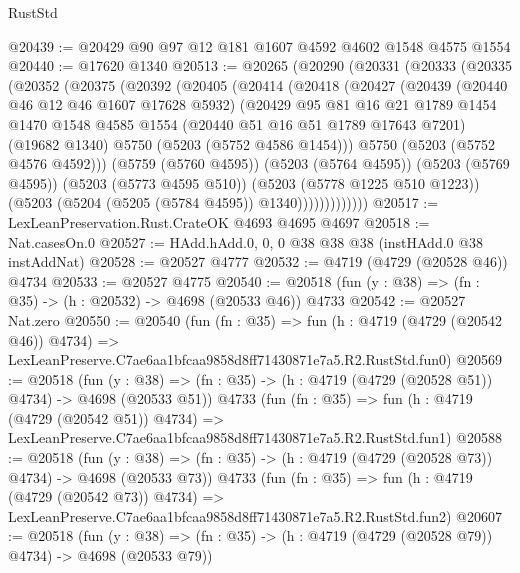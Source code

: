 \begin{lexlean}{RustStd}
\begin{coremodule}
@20439 := @20429 @90 @97 @12 @181 @1607 @4592 @4602 @1548 @4575 @1554
@20440 := @17620 @1340
@20513 := @20265
    (@20290
      (@20331
        (@20333
          (@20335
            (@20352
              (@20375
                (@20392
                  (@20405
                    (@20414
                      (@20418
                        (@20427
                          (@20439
                            (@20440 @46 @12 @46 @1607 @17628 @5932)
                            (@20429
                              @95
                              @81
                              @16
                              @21
                              @1789
                              @1454
                              @1470
                              @1548
                              @4585
                              @1554
                              (@20440 @51 @16 @51 @1789 @17643 @7201)
                              (@19682 @1340)
                              @5750
                              (@5203 (@5752 @4586 @1454)))
                            @5750
                            (@5203 (@5752 @4576 @4592)))
                          (@5759 (@5760 @4595))
                          (@5203 (@5764 @4595))
                          (@5203 (@5769 @4595))
                          (@5203 (@5773 @4595 @510))
                          (@5203 (@5778 @1225 @510 @1223))
                          (@5203 (@5204 (@5205 (@5784 @4595)) @1340)))))))))))))
@20517 := LexLeanPreservation.Rust.CrateOK @4693 @4695 @4697
@20518 := Nat.casesOn.{0}
@20527 := HAdd.hAdd.{0, 0, 0} @38 @38 @38 (instHAdd.{0} @38 instAddNat)
@20528 := @20527 @4777
@20532 := @4719 (@4729 (@20528 @46)) @4734
@20533 := @20527 @4775
@20540 := @20518 (fun (y : @38) => (fn : @35) -> (h : @20532) -> @4698 (@20533 @46)) @4733
@20542 := @20527 Nat.zero
@20550 := @20540
    (fun (fn : @35) =>
    fun (h : @4719 (@4729 (@20542 @46)) @4734) =>
    LexLeanPreserve.C7ae6aa1bfcaa9858d8ff71430871e7a5.R2.RustStd.fun0)
@20569 := @20518
    (fun (y : @38) => (fn : @35) -> (h : @4719 (@4729 (@20528 @51)) @4734) -> @4698 (@20533 @51))
    @4733
    (fun (fn : @35) =>
    fun (h : @4719 (@4729 (@20542 @51)) @4734) =>
    LexLeanPreserve.C7ae6aa1bfcaa9858d8ff71430871e7a5.R2.RustStd.fun1)
@20588 := @20518
    (fun (y : @38) => (fn : @35) -> (h : @4719 (@4729 (@20528 @73)) @4734) -> @4698 (@20533 @73))
    @4733
    (fun (fn : @35) =>
    fun (h : @4719 (@4729 (@20542 @73)) @4734) =>
    LexLeanPreserve.C7ae6aa1bfcaa9858d8ff71430871e7a5.R2.RustStd.fun2)
@20607 := @20518
    (fun (y : @38) => (fn : @35) -> (h : @4719 (@4729 (@20528 @79)) @4734) -> @4698 (@20533 @79))

\end{coremodule}
\end{lexlean}
